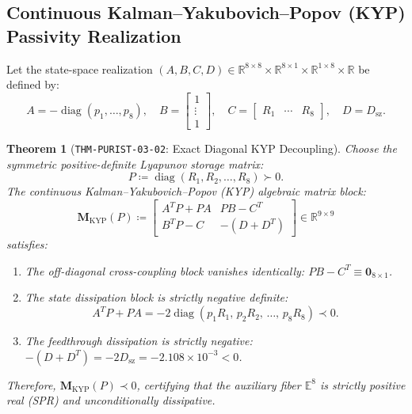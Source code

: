 \documentclass[11pt,a4paper,reqno]{article}
\theoremstyle{plain}
\newtheorem{theorem}{Theorem}[section]
\theoremstyle{definition}
\theoremstyle{remark}
\numberwithin{equation}{section}
\begin{document}
\subsection{Continuous Kalman--Yakubovich--Popov (KYP) Passivity Realization}
Let the state-space realization $(A, B, C, D) \in \mathbb{R}^{8 \times 8} \times \mathbb{R}^{8 \times 1} \times \mathbb{R}^{1 \times 8} \times \mathbb{R}$ be defined by:
\begin{equation}
  A = -\operatorname{diag}(p_1, \dots, p_8), \quad B = \begin{bmatrix} 1 \\ \vdots \\ 1 \end{bmatrix}, \quad C = \begin{bmatrix} R_1 & \cdots & R_8 \end{bmatrix}, \quad D = D_{\mathrm{sz}}.
\end{equation}

\begin{theorem}[\texttt{THM-PURIST-03-02}: Exact Diagonal KYP Decoupling]
\label{thm:kyp_passivity}
Choose the symmetric positive-definite Lyapunov storage matrix:
\begin{equation}
  P \coloneqq \operatorname{diag}(R_1, R_2, \dots, R_8) \succ 0.
\end{equation}
The continuous Kalman--Yakubovich--Popov (KYP) algebraic matrix block:
\begin{equation}
  \mathbf{M}_{\mathrm{KYP}}(P) \coloneqq \begin{bmatrix} A^T P + P A & P B - C^T \\ B^T P - C & -(D + D^T) \end{bmatrix} \in \mathbb{R}^{9 \times 9}
  \label{eq:kyp_matrix_block}
\end{equation}
satisfies:
\begin{enumerate}[label=(\roman*),leftmargin=1.8em]
  \item The off-diagonal cross-coupling block vanishes identically: $P B - C^T \equiv \bm{0}_{8 \times 1}$.
  \item The state dissipation block is strictly negative definite:
  \begin{equation}
    A^T P + P A = -2 \operatorname{diag}(p_1 R_1, \, p_2 R_2, \, \dots, \, p_8 R_8) \prec 0.
  \end{equation}
  \item The feedthrough dissipation is strictly negative: $-(D + D^T) = -2 D_{\mathrm{sz}} = -2.108 \times 10^{-3} < 0$.
\end{enumerate}
Therefore, $\mathbf{M}_{\mathrm{KYP}}(P) \prec 0$, certifying that the auxiliary fiber $\mathbb{E}^8$ is strictly positive real (SPR) and unconditionally dissipative.
\end{theorem}
\end{document}
